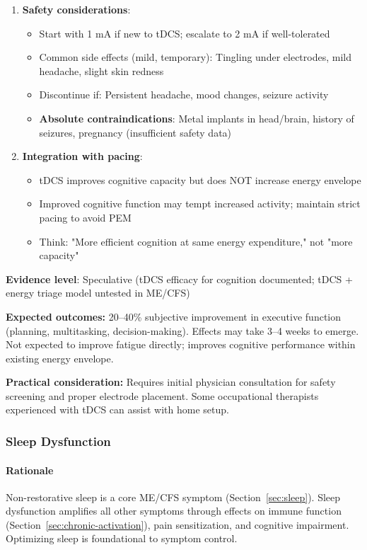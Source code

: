 \begin{recommendation}
\begin{enumerate}
    \item \textbf{Safety considerations}:
    \begin{itemize}
        \item Start with 1 mA if new to tDCS; escalate to 2 mA if well-tolerated
        \item Common side effects (mild, temporary): Tingling under electrodes, mild headache, slight skin redness
        \item Discontinue if: Persistent headache, mood changes, seizure activity
        \item \textbf{Absolute contraindications}: Metal implants in head/brain, history of seizures, pregnancy (insufficient safety data)
    \end{itemize}

    \item \textbf{Integration with pacing}:
    \begin{itemize}
        \item tDCS improves cognitive capacity but does NOT increase energy envelope
        \item Improved cognitive function may tempt increased activity; maintain strict pacing to avoid PEM
        \item Think: "More efficient cognition at same energy expenditure," not "more capacity"
    \end{itemize}
\end{enumerate}

\textbf{Evidence level}: Speculative (tDCS efficacy for cognition documented; tDCS + energy triage model untested in ME/CFS)

\textbf{Expected outcomes:} 20--40\% subjective improvement in executive function (planning, multitasking, decision-making). Effects may take 3--4 weeks to emerge. Not expected to improve fatigue directly; improves cognitive performance within existing energy envelope.

\textbf{Practical consideration:} Requires initial physician consultation for safety screening and proper electrode placement. Some occupational therapists experienced with tDCS can assist with home setup.

\end{recommendation}

\subsubsection{Sleep Dysfunction}

\paragraph{Rationale}
Non-restorative sleep is a core ME/CFS symptom (Section~\ref{sec:sleep}). Sleep dysfunction amplifies all other symptoms through effects on immune function (Section~\ref{sec:chronic-activation}), pain sensitization, and cognitive impairment. Optimizing sleep is foundational to symptom control.

